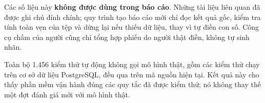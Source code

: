 Các số liệu này \textbf{không được dùng trong báo cáo}. Những tài liệu liên quan đã được ghi chú đính chính; quy trình tạo báo cáo mới chỉ đọc kết quả gốc, kiểm tra tính toàn vẹn của tệp và dừng lại nếu thiếu dữ liệu, thay vì tự điền con số. Công cụ chấm của người cũng chỉ tổng hợp phiếu do người thật điền, không tự sinh nhãn.

Toàn bộ 1.456 kiểm thử tự động không gọi mô hình thật, gồm các kiểm thử chạy trên cơ sở dữ liệu PostgreSQL, đều qua trên mã nguồn hiện tại. Kết quả này cho thấy phần mềm vận hành đúng các quy tắc đã được kiểm thử; nó không thay thế một đợt đánh giá mới với mô hình thật.
